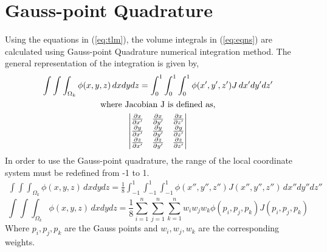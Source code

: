  \section*{Gauss-point Quadrature}\label{sec:gpq}
 Using the equations in (\ref{eq:tlm}), the volume integrals in (\ref{eq:eqns}) are calculated using Gauss-point Quadrature numerical integration method. The general representation of the integration is given by,
 \begin{equation}
 \begin{gathered}
     \label{eq:gauss}
     \int\int\int_{\Omega_k} \phi(x,y,z) \,dxdydz=\int_{0}^{1}\int_{0}^{1}\int_{0}^{1}\phi(x',y',z')J\,dx'dy'dz'\\
     $where Jacobian J is defined as,$\\
     \begin{vmatrix}
    \frac{\partial x}{\partial x'} & \frac{\partial x}{\partial y'} & \frac{\partial x}{\partial z'}\\
    \frac{\partial y}{\partial x'} & \frac{\partial y}{\partial y'} & \frac{\partial y}{\partial z'}\\
    \frac{\partial z}{\partial x'} & \frac{\partial z}{\partial y'} & \frac{\partial z}{\partial z'}
    \end{vmatrix}
     \end{gathered}
 \end{equation}
 In order to use the Gauss-point quadrature, the range of the local coordinate system must be redefined from -1 to 1.
 \begin{equation}
 \begin{gathered}
     \label{eq:gaussfinal}
     \int\int\int_{\Omega_k} \phi(x,y,z)\,dxdydz=\frac{1}{8}\int_{-1}^{1}\int_{-1}^{1}\int_{-1}^{1}\phi(x'',y'',z'')J(x'',y'',z'')\,dx''dy''dz''
     \end{gathered}
     \end{equation}
     \begin{equation}
     \label{eq:gaussfinal2}
     \int\int\int_{\Omega_k} \phi(x,y,z)\,dxdydz=\frac{1}{8}\sum\limits_{i=1}^{n}\sum\limits_{j=1}^{n}\sum\limits_{k=1}^{n}w_iw_jw_k\phi(p_i,p_j,p_k)J(p_i,p_j,p_k)
     \end{equation}
     Where $p_i,p_j,p_k$ are the Gauss points and $w_i,w_j,w_k$ are the corresponding weights.
     
    
